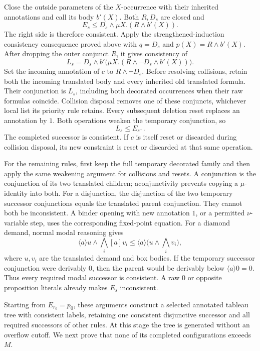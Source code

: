 Close the outside parameters of
the \(X\)-occurrence with their
inherited annotations and call its
body \(b'(X)\). Both \(R,D_s\)
are closed and
\[
 E_s\leq D_s\land\mu X.(R\land b'(X)).
\]
The right side is therefore consistent.
Apply the strengthened-induction
consistency consequence proved above
with \(q=D_s\) and
\(p(X)=R\land b'(X)\).
After dropping the outer conjunct \(R\),
it gives consistency of
\[
 L_s=
 D_s\land
 b'\bigl(\mu X.(R\land\neg D_s\land b'(X))\bigr).
\]
Set the incoming annotation of \(c\)
to \(R\land\neg D_s\).
Before resolving collisions, retain
both the incoming translated body
and every inherited old translated
formula. Their conjunction is \(L_s\),
including both decorated occurrences
when their raw formulas coincide.
Collision disposal removes one of
these conjuncts, whichever local
list its priority rule retains.
Every subsequent deletion reset
replaces an annotation by \(1\).
Both operations weaken the temporary
conjunction, so
\[
 L_s\leq E_{s^+}.
\]
The completed successor is consistent.
If \(c\) is itself reset or discarded
during collision disposal, its new
constraint is reset or discarded
at that same operation.

For the remaining rules, first keep
the full temporary decorated family
and then apply the same weakening
argument for collisions and resets.
A conjunction is the conjunction
of its two translated children;
aconjunctivity prevents copying
a \(\mu\)-identity into both.
For a disjunction, the disjunction
of the two temporary successor
conjunctions equals the translated
parent conjunction. They cannot
both be inconsistent.
A binder opening with new
annotation \(1\), or a permitted
\(\nu\)-variable step, uses the
corresponding fixed-point equation.
For a diamond demand, normal modal
reasoning gives
\[
 \langle a\rangle u\land
       \bigwedge_i[a]v_i
 \leq
 \langle a\rangle\bigl(u\land\bigwedge_i v_i\bigr),
\]
where \(u,v_i\) are the translated
demand and box bodies.
If the temporary successor
conjunction were derivably \(0\),
then the parent would be derivably
below \(\langle a\rangle0=0\).
Thus every required modal successor
is consistent. A raw \(0\) or
opposite proposition literals
already makes \(E_s\) inconsistent.

Starting from \(E_{r_0}=p_0\), these
arguments construct a selected
annotated tableau tree with consistent
labels, retaining one consistent
disjunctive successor and all required
successors of other rules.
At this stage the tree is generated
without an overflow cutoff. We next
prove that none of its completed
configurations exceeds \(M\).

